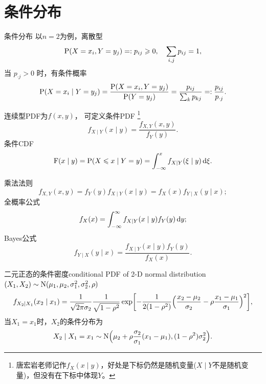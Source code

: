 \section{条件分布}

\begin{definition}
	{条件分布}{}
	以$n = 2$为例，离散型
	\[
		\P(X = x_i,Y = y_j) =: p_{ij} \geqslant 0,\quad\sum_{i,j}p_{ij} = 1,
	\]
	当 $p_{\cdot j} > 0$ 时，有条件概率
	\begin{equation}
		\P(X = x_i \mid Y = y_j) = \frac{\P(X = x_i,Y = y_j)}{\P(Y = y_j)} = \frac{p_{ij}}{\sum_kp_{kj}} =: \frac{p_{ij}}{p_{\cdot j}}.
	\end{equation}
	
	连续型PDF为$f(x,y)$，
	可定义条件PDF
	\footnote{唐宏岩老师记作$f_X(x \mid y)$，好处是下标仍然是随机变量($X \mid Y$不是随机变量)，但没有在下标中体现$Y$。}
	\begin{equation}
		f_{X\mid Y}(x \mid y) = \frac{f_{X,Y}(x,y)}{f_Y(y)}.
	\end{equation}
	条件CDF
	\begin{equation}\label{eq:ps-conditional-cdf}
		\CDF(x \mid y) = \P(X \leqslant x \mid Y = y) = \int_{-\infty}^x f_{X\mid Y}(\xi \mid y)\d \xi.
	\end{equation}%
\end{definition}

\begin{corollary}
	乘法法则
	\begin{equation}
		f_{X,Y}(x,y) = f_Y(y)f_{X\mid Y}(x \mid y) = f_X(x)f_{Y\mid X}(y \mid x);
	\end{equation}
	全概率公式 
	\begin{equation}
		f_X(x) = \intR f_{X\mid Y}(x \mid y)f_Y(y)\d y;
	\end{equation}
	Bayes公式 
	\begin{equation}
		f_{Y\mid X}(y \mid x) = \frac{f_{X\mid Y}(x \mid y)f_Y(y)}{f_X(x)}.
	\end{equation}
\end{corollary}

\begin{example}{二元正态的条件密度}{conditional PDF of 2-D normal distribution}
	$(X_1,X_2) \sim \NormalDist(\mu_1,\mu_2,\sigma_1^2,\sigma_2^2,\rho)$
	\begin{equation}
		f_{X_2\mid X_1}(x_2 \mid x_1) = \frac1{\sqrt{2\pi}\sigma_2}\frac1{\sqrt{1 - \rho^2}}\exp\biggb{-\frac1{2(1 - \rho^2)}\Bigp{\frac{x_2 - \mu_2}{\sigma_2} - \rho\frac{x_1 - \mu_1}{\sigma_1}}^2},
	\end{equation}
	当$X_1 = x_1$时，$X_2$的条件分布为
	\begin{equation}\label{eq:ps-conditional-gaussian}
		X_2 \mid X_1 = x_1 \sim \NormalDist\Bigp{\mu_2 + \rho\frac{\sigma_2}{\sigma_1}(x_1 - \mu_1),(1 - \rho^2)\sigma_2^2}.
	\end{equation}
\end{example}


